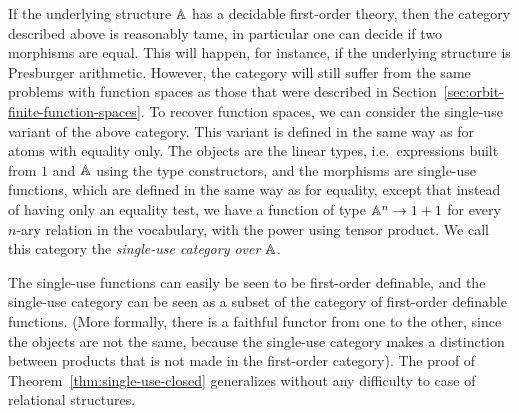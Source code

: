 If the underlying structure $\mathbb A$ has a decidable first-order theory, then the category described above is reasonably tame, in particular one can decide if two morphisms are equal. This will happen, for instance, if the underlying structure is Presburger arithmetic. However, the category will still suffer from the same problems with function spaces as those that were described in Section~\ref{sec:orbit-finite-function-spaces}. 
To recover function spaces, we can consider the single-use variant of the above category. This variant is defined in the same way as for atoms with equality only. The objects are the linear types, i.e.~expressions built from $1$ and $\mathbb A$ using the type constructors, and the morphisms are single-use functions, which are defined in the same way as for equality, except that instead of having only an equality test, we have a function of type $\mathbb A^n \to 1+1$ for every $n$-ary relation in the vocabulary, with the power using tensor product. We call this category the \emph{single-use category over $\mathbb A$}. 

The single-use functions can easily be seen to be first-order definable, and the single-use category can be seen as a subset of the category of first-order definable functions. (More formally, there is a faithful functor from one to the other, since the objects are not the same, because the single-use category makes a distinction between products that is not made in the first-order category).  The proof of Theorem~\ref{thm:single-use-closed} generalizes without any difficulty to case of relational structures. 